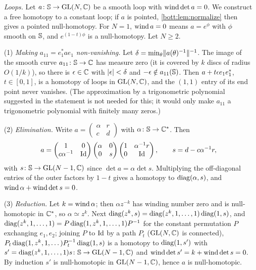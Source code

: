 \emph{Loops.} Let $a\colon\mathbb{S}\to\operatorname{GL}(N,\mathbb{C})$ be a smooth loop with $\operatorname{wind}\det a=0$. We
construct a free homotopy to a constant loop; if $a$ is pointed, \cref{bott:lem:normalize} then
gives a pointed null-homotopy. For $N=1$, $\operatorname{wind} a=0$ means $a=e^\phi$ with $\phi$ smooth on
$\mathbb{S}$, and $e^{(1-t)\phi}$ is a null-homotopy. Let $N\ge2$.

(1) \emph{Making $a_{11}=e_1^*ae_1$ non-vanishing.} Let $\delta=\min_\theta\lVert a(\theta)^{-1}\rVert^{-1}$.
The image of the smooth curve $a_{11}\colon\mathbb{S}\to\mathbb{C}$ has measure zero (it is covered by
$k$ discs of radius $O(1/k)$), so there is $\epsilon\in\mathbb{C}$ with $\lvert \epsilon\rvert<\delta$ and
$-\epsilon\notin a_{11}(\mathbb{S})$. Then $a+t\epsilon e_1e_1^*$, $t\in[0,1]$, is a homotopy of loops in
$\operatorname{GL}(N,\mathbb{C})$, and the $(1,1)$ entry of its end point never vanishes. (The approximation by a
trigonometric polynomial suggested in the statement is not needed for this; it would only make
$a_{11}$ a trigonometric polynomial with finitely many zeros.)

(2) \emph{Elimination.} Write $a=\begin{pmatrix}\alpha&r\\c&d\end{pmatrix}$ with
$\alpha\colon\mathbb{S}\to\mathbb{C}^*$. Then
\begin{equation*}
  a=\begin{pmatrix}1&0\\c\alpha^{-1}&\operatorname{Id}\end{pmatrix}
  \begin{pmatrix}\alpha&0\\0&s\end{pmatrix}
  \begin{pmatrix}1&\alpha^{-1}r\\0&\operatorname{Id}\end{pmatrix},\qquad s=d-c\alpha^{-1}r,
\end{equation*}
with $s\colon\mathbb{S}\to\operatorname{GL}(N-1,\mathbb{C})$ since $\det a=\alpha\det s$. Multiplying the off-diagonal
entries of the outer factors by $1-t$ gives a homotopy to $\operatorname{diag}(\alpha,s)$, and
$\operatorname{wind}\alpha+\operatorname{wind}\det s=0$.

(3) \emph{Reduction.} Let $k=\operatorname{wind}\alpha$; then $\alpha z^{-k}$ has winding number zero and
is null-homotopic in $\mathbb{C}^*$, so $\alpha\simeq z^k$. Next
$\operatorname{diag}(z^k,s)=\operatorname{diag}(z^k,1,\dots,1)\operatorname{diag}(1,s)$, and $\operatorname{diag}(z^k,1,\dots,1)=P\operatorname{diag}(1,z^k,1,\dots,1)P^{-1}$
for the constant permutation $P$ exchanging $e_1,e_2$; joining $P$ to $\operatorname{Id}$ by a path $P_t$
($\operatorname{GL}(N,\mathbb{C})$ is connected), $P_t\operatorname{diag}(1,z^k,1,\dots)P_t^{-1}\operatorname{diag}(1,s)$ is a homotopy to
$\operatorname{diag}(1,s')$ with $s'=\operatorname{diag}(z^k,1,\dots,1)s\colon\mathbb{S}\to\operatorname{GL}(N-1,\mathbb{C})$ and
$\operatorname{wind}\det s'=k+\operatorname{wind}\det s=0$. By induction $s'$ is null-homotopic in $\operatorname{GL}(N-1,\mathbb{C})$, hence $a$
is null-homotopic.

